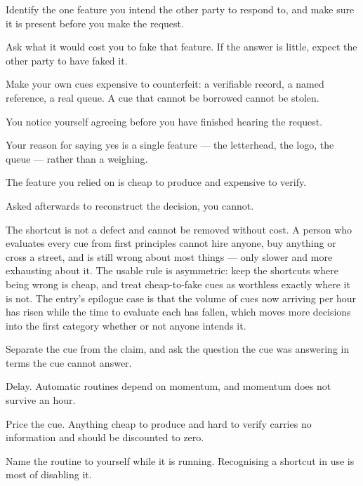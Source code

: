 \begin{application}
  \item Identify the one feature you intend the other party to respond to, and make sure it is present before you make the request.
  \item Ask what it would cost you to fake that feature. If the answer is little, expect the other party to have faked it.
  \item Make your own cues expensive to counterfeit: a verifiable record, a named reference, a real queue. A cue that cannot be borrowed cannot be stolen.
\end{application}

\begin{feedback}
  \item You notice yourself agreeing before you have finished hearing the request.
  \item Your reason for saying yes is a single feature --- the letterhead, the logo, the queue --- rather than a weighing.
  \item The feature you relied on is cheap to produce and expensive to verify.
  \item Asked afterwards to reconstruct the decision, you cannot.
\end{feedback}

\begin{failure}
The shortcut is not a defect and cannot be removed without cost. A person who evaluates every cue from first principles cannot hire anyone, buy anything or cross a street, and is still wrong about most things --- only slower and more exhausting about it. The usable rule is asymmetric: keep the shortcuts where being wrong is cheap, and treat cheap-to-fake cues as worthless exactly where it is not. The entry's epilogue case is that the volume of cues now arriving per hour has risen while the time to evaluate each has fallen, which moves more decisions into the first category whether or not anyone intends it.
\end{failure}

\begin{countermeasures}
  \item Separate the cue from the claim, and ask the question the cue was answering in terms the cue cannot answer.
  \item Delay. Automatic routines depend on momentum, and momentum does not survive an hour.
  \item Price the cue. Anything cheap to produce and hard to verify carries no information and should be discounted to zero.
  \item Name the routine to yourself while it is running. Recognising a shortcut in use is most of disabling it.
\end{countermeasures}

\seesources
{}
